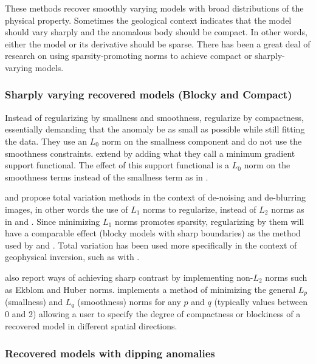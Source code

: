These methods recover smoothly varying models with broad distributions of the physical property. Sometimes the geological context indicates that the model should vary sharply and the anomalous body should be compact. In other words, either the model or its derivative should be sparse. There has been a great deal of research on using sparsity-promoting norms to achieve compact or sharply-varying models.

\subsubsection{Sharply varying recovered models (Blocky and Compact)}
\label{subsubsec:sharp}
Instead of regularizing by smallness and smoothness, \cite{last1983compact} regularize by compactness, essentially demanding that the anomaly be as small as possible while still fitting the data. They use an $L_0$ norm on the smallness component and do not use the smoothness constraints. \cite{portniaguine1999focusing} extend  \cite{last1983compact} by adding what they call a minimum gradient support functional. The effect of this support functional is a $L_0$ norm on the smoothness terms instead of the smallness term as in \cite{last1983compact}.

\cite{rudin1992nonlinear} and \cite{vogel1998fast} propose total variation methods in the context of de-noising and de-blurring images, in other words the use of $L_1$ norms to regularize, instead of $L_2$ norms as in \cite{li19963} and \cite{li19983}. Since minimizing $L_1$ norms promotes sparsity, regularizing by them will have a comparable effect (blocky models with sharp boundaries) as the method used by \cite{last1983compact} and \cite{portniaguine1999focusing}. Total variation has been used more specifically in the context of geophysical inversion, such as with \cite{guitton2012blocky}.	

\cite{farquharson1998non} also report ways of achieving sharp contrast by implementing non-$L_2$ norms such as Ekblom and Huber norms. \cite{fournier2015cooperative} implements a method of minimizing the general $L_p$ (smallness) and $L_q$ (smoothness) norms for any $p$ and $q$ (typically values between 0 and 2) allowing a user to specify the degree of compactness or blockiness of a recovered model in different spatial directions.

\subsubsection{Recovered models with dipping anomalies}
\label{subsubsec:dipping}

